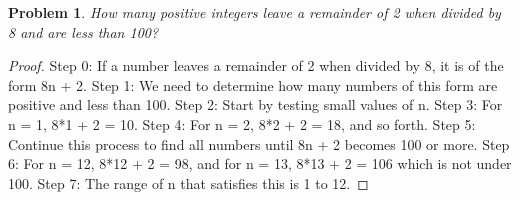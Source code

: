 \documentclass{article}
\newtheorem{theorem}{Problem}
\begin{document}
\begin{theorem}
How many positive integers leave a remainder of 2 when divided by 8 and are less than 100?
\end{theorem}

\begin{proof}
Step 0: If a number leaves a remainder of 2 when divided by 8, it is of the form 8n + 2.
Step 1: We need to determine how many numbers of this form are positive and less than 100.
Step 2: Start by testing small values of n.
Step 3: For n = 1, 8*1 + 2 = 10.
Step 4: For n = 2, 8*2 + 2 = 18, and so forth.
Step 5: Continue this process to find all numbers until 8n + 2 becomes 100 or more.
Step 6: For n = 12, 8*12 + 2 = 98, and for n = 13, 8*13 + 2 = 106 which is not under 100.
Step 7: The range of n that satisfies this is 1 to 12.
\end{proof}
\end{document}
